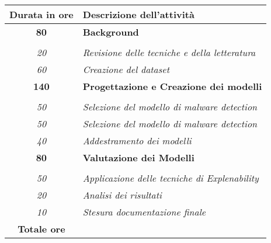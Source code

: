

\begin{tabularx}{\textwidth}{|c|X|}
	\hline
	\textbf{Durata in ore} & \textbf{Descrizione dell'attività} \\\hline
	
	\textbf{80} & \textbf{Background} \\ \hdashline 
    \multirow{2}{0cm}\\ 
    \textit{20} & 
    \textit{Revisione delle tecniche e della letteratura} \\
    \textit{60} & 
    \textit{Creazione del dataset} \\
    \hline
    
    \textbf{140} & \textbf{Progettazione e Creazione dei modelli} \\ \hdashline 
    \multirow{3}{0cm}\\ 
    \textit{50} & 
    \textit{Selezione del modello di malware detection} \\
    \textit{50} & 
    \textit{Selezione del modello di malware detection} \\
    \textit{40} & 
    \textit{Addestramento dei modelli} \\
    \hline
    
    \textbf{80} & \textbf{Valutazione dei Modelli}  \\ \hdashline 
    \multirow{2}{0cm}\\ 
    \textit{50} & 
    \textit{Applicazione delle tecniche di Explenability} \\
    \textit{20} & 
    \textit{Analisi dei risultati}\\
    \textit{10} & 
    \textit{Stesura documentazione finale} \\
    \hline
	
	\textbf{Totale ore} & \multicolumn{1}{|c|}{\textbf{\totaleOre}} \\\hline
	
\end{tabularx}